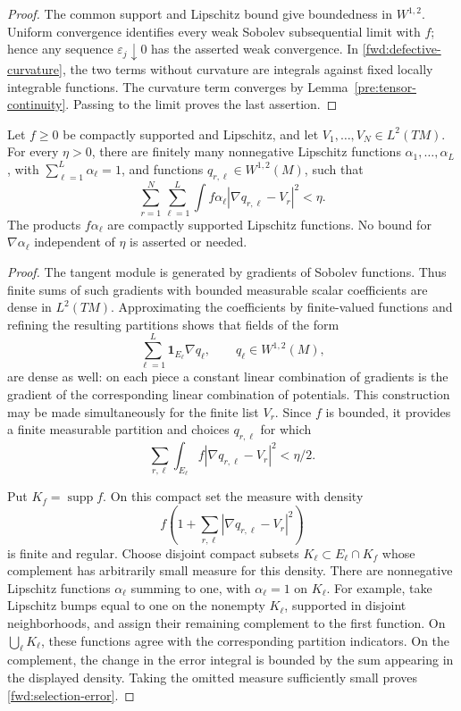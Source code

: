 \begin{proof}
The common support and Lipschitz bound give boundedness in
\(W^{1,2}\). Uniform convergence identifies every weak Sobolev
subsequential limit with \(f\); hence any sequence
\(\varepsilon_j\downarrow0\) has the asserted weak convergence.
In \eqref{fwd:defective-curvature}, the two terms without curvature
are integrals against fixed locally integrable functions. The
curvature term converges by Lemma~\ref{pre:tensor-continuity}. Passing
to the limit proves the last assertion.
\end{proof}

\begin{lemma}
\label{fwd:gradient-selection}
Let \(f\geq0\) be compactly supported and Lipschitz, and let
\(V_1,\ldots,V_N\in L^2(TM)\). For every \(\eta>0\), there are
finitely many nonnegative Lipschitz functions
\(\alpha_1,\ldots,\alpha_L\), with
\(\sum_{\ell=1}^L\alpha_\ell=1\), and functions
\(q_{r,\ell}\in W^{1,2}(M)\), such that
\begin{equation}
\label{fwd:selection-error}
 \sum_{r=1}^N\sum_{\ell=1}^L
 \int f\alpha_\ell|\nabla q_{r,\ell}-V_r|^2<\eta.
\end{equation}
The products \(f\alpha_\ell\) are compactly supported Lipschitz
functions. No bound for \(\nabla\alpha_\ell\) independent of
\(\eta\) is asserted or needed.
\end{lemma}

\begin{proof}
The tangent module is generated by gradients of Sobolev functions.
Thus finite sums of such gradients with bounded measurable scalar
coefficients are dense in \(L^2(TM)\). Approximating the coefficients
by finite-valued functions and refining the resulting partitions
shows that fields of the form
\[
 \sum_{\ell=1}^L\mathbf1_{E_\ell}\nabla q_\ell,
 \qquad q_\ell\in W^{1,2}(M),
\]
are dense as well: on each piece a constant linear combination of
gradients is the gradient of the corresponding linear combination
of potentials. This construction may be made simultaneously for
the finite list \(V_r\). Since \(f\) is bounded, it provides a
finite measurable partition and choices \(q_{r,\ell}\) for which
\[
 \sum_{r,\ell}\int_{E_\ell}
       f|\nabla q_{r,\ell}-V_r|^2<\eta/2.
\]

Put \(K_f=\operatorname{supp}f\). On this compact set the measure
with density
\[
 f\left(1+\sum_{r,\ell}|\nabla q_{r,\ell}-V_r|^2\right)
\]
is finite and regular. Choose disjoint compact subsets
\(K_\ell\subset E_\ell\cap K_f\) whose complement has arbitrarily
small measure for this density. There are nonnegative Lipschitz
functions \(\alpha_\ell\) summing to one, with
\(\alpha_\ell=1\) on \(K_\ell\). For example, take Lipschitz bumps
equal to one on the nonempty \(K_\ell\), supported in disjoint
neighborhoods, and assign their remaining complement to the first
function. On \(\bigcup_\ell K_\ell\), these functions agree with
the corresponding partition indicators. On the complement, the
change in the error integral is bounded by the sum appearing in
the displayed density. Taking the omitted measure sufficiently
small proves \eqref{fwd:selection-error}.
\end{proof}

